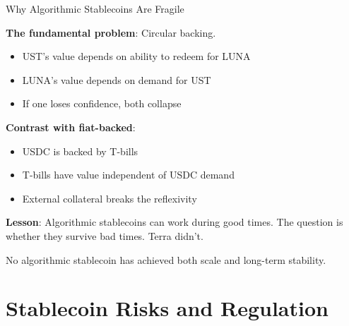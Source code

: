 \documentclass[10pt]{beamer}
\begin{document}
\begin{frame}{Why Algorithmic Stablecoins Are Fragile}
  
  \textbf{The fundamental problem}: Circular backing.
  
  \vspace{0.5em}
  \begin{itemize}
    \item UST's value depends on ability to redeem for LUNA
    \item LUNA's value depends on demand for UST
    \item If one loses confidence, both collapse
  \end{itemize}
  
  \vspace{1em}
  \textbf{Contrast with fiat-backed}:
  \begin{itemize}
    \item USDC is backed by T-bills
    \item T-bills have value independent of USDC demand
    \item External collateral breaks the reflexivity
  \end{itemize}
  
  \vspace{1em}
  \textbf{Lesson}: Algorithmic stablecoins can work during good times. The question is whether they survive bad times. Terra didn't.
  
  \vspace{0.5em}
  No algorithmic stablecoin has achieved both scale and long-term stability.
\end{frame}

\section{Stablecoin Risks and Regulation}
\end{document}
